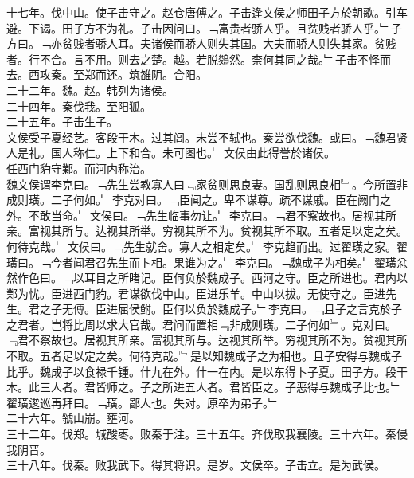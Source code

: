 \documentclass{zhvt-classic}
\begin{document}
\hspace*{2em}十七年。伐中山。使子击守之。赵仓唐傅之。子击逢文侯之师田子方於朝歌。引车避。下谒。田子方不为礼。子击因问曰。﹁富贵者骄人乎。且贫贱者骄人乎。﹂子方曰。﹁亦贫贱者骄人耳。夫诸侯而骄人则失其国。大夫而骄人则失其家。贫贱者。行不合。言不用。则去之楚。越。若脱鵕然。柰何其同之哉。﹂子击不怿而去。西攻秦。至郑而还。筑雒阴。合阳。\\
\hspace*{2em}二十二年。魏。赵。韩列为诸侯。\\
\hspace*{2em}二十四年。秦伐我。至阳狐。\\
\hspace*{2em}二十五年。子击生子。\\
\hspace*{2em}文侯受子夏经艺。客段干木。过其闾。未尝不轼也。秦尝欲伐魏。或曰。﹁魏君贤人是礼。国人称仁。上下和合。未可图也。﹂文侯由此得誉於诸侯。\\
\hspace*{2em}任西门豹守鄴。而河内称治。\\
\hspace*{2em}魏文侯谓李克曰。﹁先生尝教寡人曰﹃家贫则思良妻。国乱则思良相﹄。今所置非成则璜。二子何如。﹂李克对曰。﹁臣闻之。卑不谋尊。疏不谋戚。臣在阙门之外。不敢当命。﹂文侯曰。﹁先生临事勿让。﹂李克曰。﹁君不察故也。居视其所亲。富视其所与。达视其所举。穷视其所不为。贫视其所不取。五者足以定之矣。何待克哉。﹂文侯曰。﹁先生就舍。寡人之相定矣。﹂李克趋而出。过翟璜之家。翟璜曰。﹁今者闻君召先生而卜相。果谁为之。﹂李克曰。﹁魏成子为相矣。﹂翟璜忿然作色曰。﹁以耳目之所睹记。臣何负於魏成子。西河之守。臣之所进也。君内以鄴为忧。臣进西门豹。君谋欲伐中山。臣进乐羊。中山以拔。无使守之。臣进先生。君之子无傅。臣进屈侯鲋。臣何以负於魏成子。﹂李克曰。﹁且子之言克於子之君者。岂将比周以求大官哉。君问而置相﹃非成则璜。二子何如﹄。克对曰。﹃君不察故也。居视其所亲。富视其所与。达视其所举。穷视其所不为。贫视其所不取。五者足以定之矣。何待克哉。﹄是以知魏成子之为相也。且子安得与魏成子比乎。魏成子以食禄千锺。什九在外。什一在内。是以东得卜子夏。田子方。段干木。此三人者。君皆师之。子之所进五人者。君皆臣之。子恶得与魏成子比也。﹂翟璜逡巡再拜曰。﹁璜。鄙人也。失对。原卒为弟子。﹂\\
\hspace*{2em}二十六年。虢山崩。壅河。\\
\hspace*{2em}三十二年。伐郑。城酸枣。败秦于注。三十五年。齐伐取我襄陵。三十六年。秦侵我阴晋。\\
\hspace*{2em}三十八年。伐秦。败我武下。得其将识。是岁。文侯卒。子击立。是为武侯。\\
\end{document}
